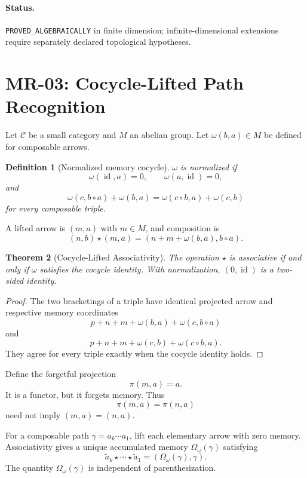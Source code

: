 \documentclass[11pt]{article}
\newtheorem{theorem}{Theorem}[section]
\newtheorem{definition}[theorem]{Definition}
\newcommand{\status}[1]{\texttt{#1}}
\begin{document}
\paragraph{Status.}
\status{PROVED\_ALGEBRAICALLY} in finite dimension; infinite-dimensional extensions require separately declared topological hypotheses.

\section{MR-03: Cocycle-Lifted Path Recognition}

Let \(\mathcal C\) be a small category and \(M\) an abelian group. Let \(\omega(b,a)\in M\) be defined for composable arrows.

\begin{definition}[Normalized memory cocycle]
\(\omega\) is normalized if
\[
\omega(\operatorname{id},a)=0,
\qquad
\omega(a,\operatorname{id})=0,
\]
and
\[
\boxed{
\omega(c,b\circ a)+\omega(b,a)
=
\omega(c\circ b,a)+\omega(c,b)
}
\]
for every composable triple.
\end{definition}

A lifted arrow is \((m,a)\) with \(m\in M\), and composition is
\[
\boxed{
(n,b)\star(m,a)
=
(n+m+\omega(b,a),b\circ a).
}
\]

\begin{theorem}[Cocycle-Lifted Associativity]
The operation \(\star\) is associative if and only if \(\omega\) satisfies the cocycle identity. With normalization, \((0,\operatorname{id})\) is a two-sided identity.
\end{theorem}

\begin{proof}
The two bracketings of a triple have identical projected arrow and respective memory coordinates
\[
p+n+m+\omega(b,a)+\omega(c,b\circ a)
\]
and
\[
p+n+m+\omega(c,b)+\omega(c\circ b,a).
\]
They agree for every triple exactly when the cocycle identity holds.
\end{proof}

Define the forgetful projection
\[
\pi(m,a)=a.
\]
It is a functor, but it forgets memory. Thus
\[
\pi(m,a)=\pi(n,a)
\]
need not imply \((m,a)=(n,a)\).

For a composable path \(\gamma=a_k\cdots a_1\), lift each elementary arrow with zero memory. Associativity gives a unique accumulated memory \(\Omega_\omega(\gamma)\) satisfying
\[
\widetilde a_k\star\cdots\star\widetilde a_1
=
(\Omega_\omega(\gamma),\gamma).
\]
The quantity \(\Omega_\omega(\gamma)\) is independent of parenthesization.
\end{document}
